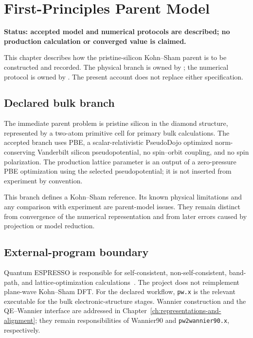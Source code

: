 \chapter{First-Principles Parent Model}
\label{ch:first-principles-parent}

\textbf{Status: accepted model and numerical protocols are described; no
production calculation or converged value is claimed.}

This chapter describes how the pristine-silicon Kohn--Sham parent is to be
constructed and recorded. The physical branch is owned by
; the numerical
protocol is owned by
. The present
account does not replace either specification.

\section{Declared bulk branch}

The immediate parent problem is pristine silicon in the diamond structure,
represented by a two-atom primitive cell for primary bulk calculations. The
accepted branch uses PBE, a scalar-relativistic PseudoDojo optimized
norm-conserving Vanderbilt silicon pseudopotential, no spin--orbit coupling, and
no spin polarization. The production lattice parameter is an output of a
zero-pressure PBE optimization using the selected pseudopotential; it is not
inserted from experiment by convention.

This branch defines a Kohn--Sham reference. Its known physical limitations and
any comparison with experiment are parent-model issues. They remain distinct
from convergence of the numerical representation and from later errors caused
by projection or model reduction.

\section{External-program boundary}

Quantum ESPRESSO is responsible for self-consistent, non-self-consistent,
band-path, and lattice-optimization calculations~\cite{giannozzi2009}. The
project does not
reimplement plane-wave Kohn--Sham DFT. For the declared workflow,
\texttt{pw.x} is the relevant executable for the bulk electronic-structure
stages. Wannier construction and the QE--Wannier interface are addressed in
Chapter~\ref{ch:representations-and-alignment}; they remain responsibilities of
Wannier90 and \texttt{pw2wannier90.x}, respectively.

